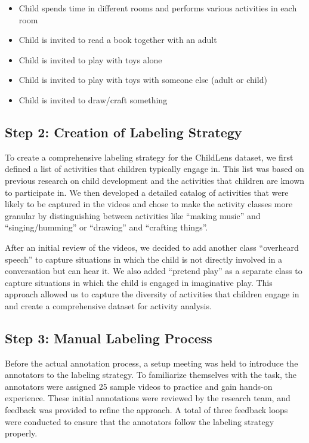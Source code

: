 \documentclass[
  man,floatsintext]{apa6}
\providecommand{\tightlist}{%
  \setlength{\itemsep}{0pt}\setlength{\parskip}{0pt}}
\begin{document}
\begin{itemize}
\tightlist
\item
  Child spends time in different rooms and performs various activities in each room
\item
  Child is invited to read a book together with an adult
\item
  Child is invited to play with toys alone
\item
  Child is invited to play with toys with someone else (adult or child)
\item
  Child is invited to draw/craft something
\end{itemize}

\subsection{Step 2: Creation of Labeling Strategy}\label{step-2-creation-of-labeling-strategy}

To create a comprehensive labeling strategy for the ChildLens dataset, we first defined a list of activities that children typically engage in. This list was based on previous research on child development and the activities that children are known to participate in. We then developed a detailed catalog of activities that were likely to be captured in the videos and chose to make the activity classes more granular by distinguishing between activities like ``making music'' and ``singing/humming'' or ``drawing'' and ``crafting things''.

After an initial review of the videos, we decided to add another class ``overheard speech'' to capture situations in which the child is not directly involved in a conversation but can hear it. We also added ``pretend play'' as a separate class to capture situations in which the child is engaged in imaginative play. This approach allowed us to capture the diversity of activities that children engage in and create a comprehensive dataset for activity analysis.

\subsection{Step 3: Manual Labeling Process}\label{step-3-manual-labeling-process}

Before the actual annotation process, a setup meeting was held to introduce the annotators to the labeling strategy. To familiarize themselves with the task, the annotators were assigned 25 sample videos to practice and gain hands-on experience. These initial annotations were reviewed by the research team, and feedback was provided to refine the approach. A total of three feedback loops were conducted to ensure that the annotators follow the labeling strategy properly.
\end{document}
